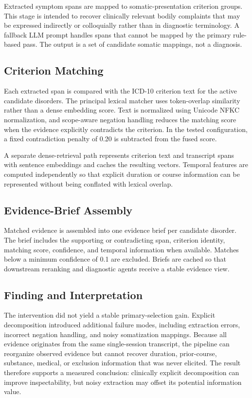 Extracted symptom spans are mapped to somatic-presentation criterion groups.
This stage is intended to recover clinically relevant bodily complaints that
may be expressed indirectly or colloquially rather than in diagnostic
terminology. A fallback LLM prompt handles spans that cannot be mapped by the
primary rule-based pass. The output is a set of candidate somatic mappings,
not a diagnosis.

\subsection{Criterion Matching}

Each extracted span is compared with the ICD-10 criterion text for the active
candidate disorders. The principal lexical matcher uses token-overlap
similarity rather than a dense embedding score. Text is normalized using
Unicode NFKC normalization, and scope-aware negation handling reduces the
matching score when the evidence explicitly contradicts the criterion. In the
tested configuration, a fixed contradiction penalty of 0.20 is subtracted
from the fused score.

A separate dense-retrieval path represents criterion text and transcript spans
with sentence embeddings and caches the resulting vectors. Temporal features
are computed independently so that explicit duration or course information can
be represented without being conflated with lexical overlap.

\subsection{Evidence-Brief Assembly}

Matched evidence is assembled into one evidence brief per candidate disorder.
The brief includes the supporting or contradicting span, criterion identity,
matching score, confidence, and temporal information when available. Matches
below a minimum confidence of 0.1 are excluded. Briefs are cached so that
downstream reranking and diagnostic agents receive a stable evidence view.

\subsection{Finding and Interpretation}

The intervention did not yield a stable primary-selection gain. Explicit
decomposition introduced additional failure modes, including extraction
errors, incorrect negation handling, and noisy somatization mappings. Because
all evidence originates from the same single-session transcript, the pipeline
can reorganize observed evidence but cannot recover duration, prior-course,
substance, medical, or exclusion information that was never elicited. The
result therefore supports a measured conclusion: clinically explicit
decomposition can improve inspectability, but noisy extraction may offset its
potential information value.

